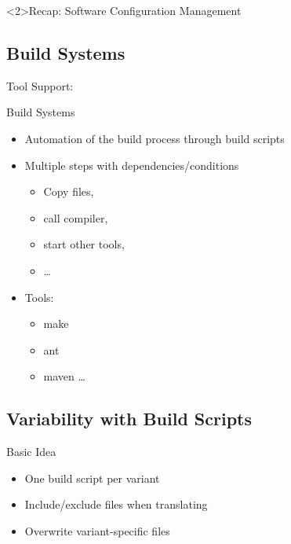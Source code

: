 
\begin{frame}<2>{Recap: Software Configuration Management}
	\frameSoftwareConfigurationManagement
\end{frame}

\subsection{Build Systems}

\begin{frame}{Tool Support: \myframetitle}
	\begin{mycolumns}[widths={40},animation=none]
		\begin{definition}{Build Systems} %
			\begin{itemize}
				\item Automation of the build process through build scripts
				\item Multiple steps with dependencies/conditions
				\begin{itemize}
					\item Copy files, 
					\item call compiler, 
					\item start other tools, 
					\item \ldots
				\end{itemize}
				\item Tools: 
				\begin{itemize}
					\item make
					\item ant
					\item maven
					\ldots
				\end{itemize}
			\end{itemize}
		\end{definition}
	\mynextcolumn
	\end{mycolumns}	
\end{frame}

\subsection{Variability with Build Scripts}

\begin{frame}{\myframetitle}
	\vspace{-\textheightoftitle}
	\begin{mycolumns}
		\begin{note}{Basic Idea}
			\begin{itemize}
				\item One build script per variant
				\item Include/exclude files when translating
				\item Overwrite variant-specific files
			\end{itemize}
		\end{note}
	\mynextcolumn
		\centering{}
	\end{mycolumns}	
\end{frame}


